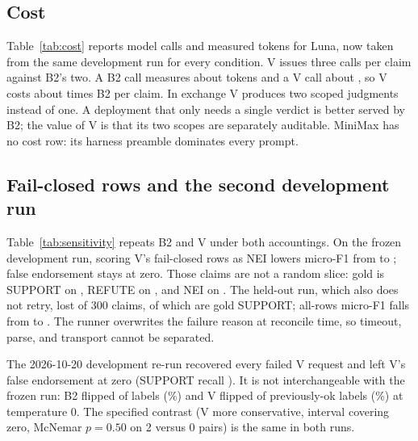 \documentclass[11pt,a4paper]{article}
\begin{document}
\subsection{Cost}

Table~\ref{tab:cost} reports model calls and measured tokens for Luna,
now taken from the same development run for every condition. V issues
three calls per claim against B2's two. A B2 call measures about
\lunadevBTwoTokensPerCall{} tokens and a V call about
\lunadevVTokensPerCall{}, so V costs about \lunaTokenRatio{} times B2
per claim. In exchange V produces two scoped judgments instead of one.
A deployment that only needs a single verdict is better served by B2;
the value of V is that its two scopes are separately auditable. MiniMax
has no cost row: its harness preamble dominates every prompt.

\begin{table}[t]
\centering
\caption{Calls per claim and measured tokens for GPT-6 Luna, taken from
the development run that recorded the most calls for each condition.
Estimated tokens per claim is the product of the two preceding columns.
Resumed runs keep only the last invocation's usage record, so this is
an estimate, not a per-claim total.}
\label{tab:cost}

\end{table}

\subsection{Fail-closed rows and the second development run}
\label{sec:second-run}

Table~\ref{tab:sensitivity} repeats B2 and V under both accountings.
On the frozen development run, scoring V's \lunadevVfailclosed{}
fail-closed rows as NEI lowers micro-F1 from \lunadevVmicroFOne{} to
\lunadevVallrowsmicroFOne{}; false endorsement stays at zero. Those
\lunadevVfailclosed{} claims are not a random slice: gold is SUPPORT on
\lunadevVfailsupport{}, REFUTE on \lunadevVfailrefute{}, and NEI on
\lunadevVfailnei{}. The held-out run, which also does not retry, lost
\lunaheldVfailclosed{} of 300 claims, of which
\lunaheldVfailsupport{} are gold SUPPORT; all-rows micro-F1 falls from
\lunaheldVmicroFOne{} to \lunaheldVallrowsmicroFOne{}. The runner
overwrites the failure reason at reconcile time, so timeout, parse, and
transport cannot be separated.

The 2026-10-20 development re-run recovered every failed V request and
left V's false endorsement at zero (SUPPORT recall
\lunarerunVsupportRecall{}). It is not interchangeable with the frozen
run: B2 flipped \lunaflipsBTwo{} of \lunaflipsBTwon{} labels
(\lunaflipsBTwopct{}\%) and V flipped \lunaflipsV{} of
\lunaflipsVn{} previously-ok labels (\lunaflipsVpct{}\%) at
temperature 0. The specified contrast (V more conservative, interval
covering zero, McNemar $p=0.50$ on 2 versus 0 pairs) is the same in
both runs.
\end{document}
